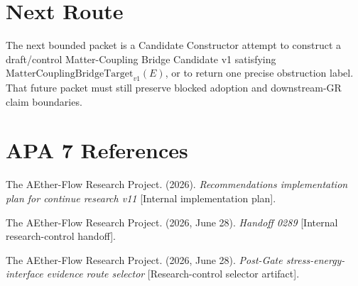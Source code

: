 \documentclass[11pt]{article}
\newcommand{\MCBT}{\mathrm{MatterCouplingBridgeTarget}_{v1}}
\begin{document}
\section{Next Route}

The next bounded packet is a Candidate Constructor attempt to construct a
draft/control Matter-Coupling Bridge Candidate v1 satisfying
\(\MCBT(E)\), or to return one precise obstruction label. That future packet
must still preserve blocked adoption and downstream-GR claim boundaries.

\section{APA 7 References}

The AEther-Flow Research Project. (2026). \emph{Recommendations implementation
plan for continue research v11} [Internal implementation plan].

The AEther-Flow Research Project. (2026, June 28). \emph{Handoff 0289}
[Internal research-control handoff].

The AEther-Flow Research Project. (2026, June 28). \emph{Post-Gate
stress-energy-interface evidence route selector} [Research-control selector
artifact].
\end{document}
